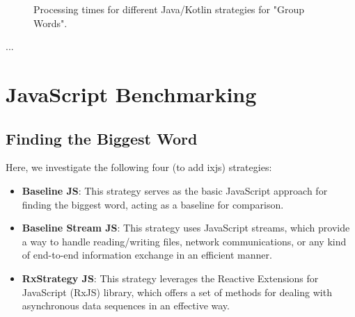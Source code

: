     \begin{figure}[H]
        \centering
        \caption{Processing times for different Java/Kotlin strategies for "Group Words".}
        \label{fig:processing_times}
    \end{figure}
    

    \clearpage
... 


\section{JavaScript Benchmarking}
\label{sec:js_implementation}


\subsection{Finding the Biggest Word}
\label{subsec:biggest_word_js}

Here, we investigate the following four (to add ixjs) strategies:

\begin{itemize}
    \item \textbf{Baseline JS}: This strategy serves as the basic JavaScript approach for finding the biggest word, acting as a baseline for comparison.
    \item \textbf{Baseline Stream JS}: This strategy uses JavaScript streams, which provide a way to handle reading/writing files, network communications, or any kind of end-to-end information exchange in an efficient manner.
    \item \textbf{RxStrategy JS}: This strategy leverages the Reactive Extensions for JavaScript (RxJS) library, which offers a set of methods for dealing with asynchronous data sequences in an effective way.
\end{itemize}



